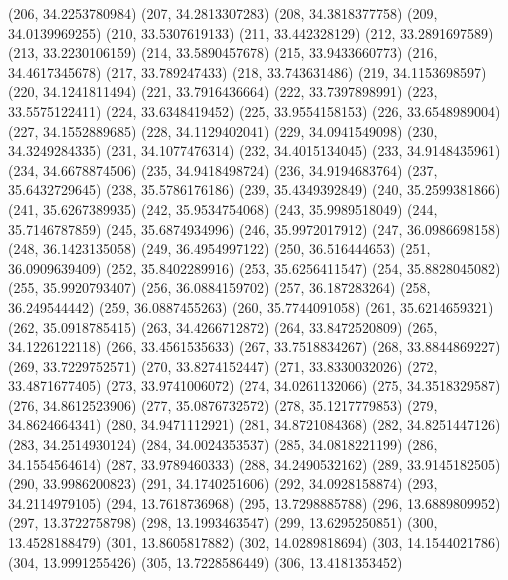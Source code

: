 {					(206, 34.2253780984)
					(207, 34.2813307283)
					(208, 34.3818377758)
					(209, 34.0139969255)
					(210, 33.5307619133)
					(211, 33.442328129)
					(212, 33.2891697589)
					(213, 33.2230106159)
					(214, 33.5890457678)
					(215, 33.9433660773)
					(216, 34.4617345678)
					(217, 33.789247433)
					(218, 33.743631486)
					(219, 34.1153698597)
					(220, 34.1241811494)
					(221, 33.7916436664)
					(222, 33.7397898991)
					(223, 33.5575122411)
					(224, 33.6348419452)
					(225, 33.9554158153)
					(226, 33.6548989004)
					(227, 34.1552889685)
					(228, 34.1129402041)
					(229, 34.0941549098)
					(230, 34.3249284335)
					(231, 34.1077476314)
					(232, 34.4015134045)
					(233, 34.9148435961)
					(234, 34.6678874506)
					(235, 34.9418498724)
					(236, 34.9194683764)
					(237, 35.6432729645)
					(238, 35.5786176186)
					(239, 35.4349392849)
					(240, 35.2599381866)
					(241, 35.6267389935)
					(242, 35.9534754068)
					(243, 35.9989518049)
					(244, 35.7146787859)
					(245, 35.6874934996)
					(246, 35.9972017912)
					(247, 36.0986698158)
					(248, 36.1423135058)
					(249, 36.4954997122)
					(250, 36.516444653)
					(251, 36.0909639409)
					(252, 35.8402289916)
					(253, 35.6256411547)
					(254, 35.8828045082)
					(255, 35.9920793407)
					(256, 36.0884159702)
					(257, 36.187283264)
					(258, 36.249544442)
					(259, 36.0887455263)
					(260, 35.7744091058)
					(261, 35.6214659321)
					(262, 35.0918785415)
					(263, 34.4266712872)
					(264, 33.8472520809)
					(265, 34.1226122118)
					(266, 33.4561535633)
					(267, 33.7518834267)
					(268, 33.8844869227)
					(269, 33.7229752571)
					(270, 33.8274152447)
					(271, 33.8330032026)
					(272, 33.4871677405)
					(273, 33.9741006072)
					(274, 34.0261132066)
					(275, 34.3518329587)
					(276, 34.8612523906)
					(277, 35.0876732572)
					(278, 35.1217779853)
					(279, 34.8624664341)
					(280, 34.9471112921)
					(281, 34.8721084368)
					(282, 34.8251447126)
					(283, 34.2514930124)
					(284, 34.0024353537)
					(285, 34.0818221199)
					(286, 34.1554564614)
					(287, 33.9789460333)
					(288, 34.2490532162)
					(289, 33.9145182505)
					(290, 33.9986200823)
					(291, 34.1740251606)
					(292, 34.0928158874)
					(293, 34.2114979105)
					(294, 13.7618736968)
					(295, 13.7298885788)
					(296, 13.6889809952)
					(297, 13.3722758798)
					(298, 13.1993463547)
					(299, 13.6295250851)
					(300, 13.4528188479)
					(301, 13.8605817882)
					(302, 14.0289818694)
					(303, 14.1544021786)
					(304, 13.9991255426)
					(305, 13.7228586449)
					(306, 13.4181353452)
}
